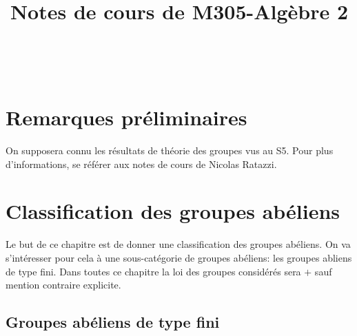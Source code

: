 \documentclass{report}
\theoremstyle{definition}
\begin{document}
\title{Notes de cours de M305-Alg\`ebre 2}

\makeatletter
\begin{titlepage}
    \vspace*{\fill}
    \begin{center}
      {\Huge \@title}\\[0.5cm]
      {\Large \@date}
    \end{center}
    \vspace*{\fill}
\end{titlepage}
\makeatother

\newpage

\tableofcontents

\newpage




\chapter*{Remarques pr\'eliminaires}

On supposera connu les r\'esultats de th\'eorie des groupes vus au S5. Pour plus d'informations, se r\'ef\'erer aux notes de cours de Nicolas Ratazzi.

\chapter{Classification des groupes ab\'eliens}

Le but de ce chapitre est de donner une classification des groupes ab\'eliens. On va s'int\'eresser pour cela \`a une sous-cat\'egorie de groupes ab\'eliens: les groupes abliens de type fini. Dans toutes ce chapitre la loi des groupes consid\'er\'es sera $+$ sauf mention contraire explicite.

\section{Groupes ab\'eliens de type fini}
\end{document}
